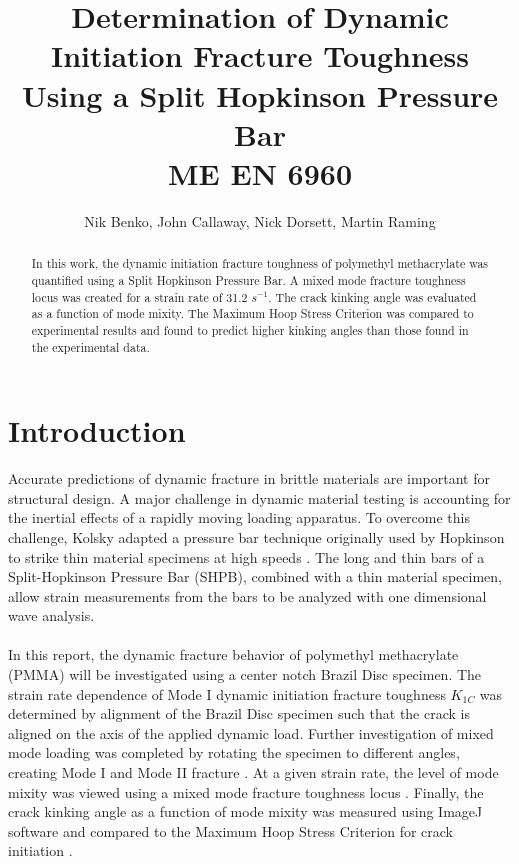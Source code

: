 \documentclass[12pt]{article}
\begin{document}
\title{ Determination of Dynamic Initiation Fracture Toughness Using a Split Hopkinson Pressure Bar  \\ \normalsize{ME EN 6960}}
\author{Nik Benko, John Callaway, Nick Dorsett, Martin Raming}
\maketitle

\begin{abstract} 
In this work, the dynamic initiation fracture toughness of polymethyl methacrylate was quantified using a Split Hopkinson Pressure Bar. A mixed mode fracture toughness locus was created for a strain rate of 31.2 $s^{-1}$. The crack kinking angle was evaluated as a function of mode mixity. The Maximum Hoop Stress Criterion was compared to experimental results and found to predict higher kinking angles than those found in the experimental data.
\end{abstract}

\section{Introduction} %

Accurate predictions of dynamic fracture in brittle materials are important for structural design. A major challenge in dynamic material testing is accounting for the inertial effects of a rapidly moving loading apparatus. To overcome this challenge, Kolsky adapted a pressure bar technique originally used by Hopkinson to strike thin material specimens at high speeds \cite{Kolsky}. The long and thin bars of a Split-Hopkinson Pressure Bar (SHPB), combined with a thin material specimen, allow strain measurements from the bars to be analyzed with one dimensional wave analysis. 
\\ \\
In this report, the dynamic fracture behavior of polymethyl methacrylate (PMMA) will be investigated using a center notch Brazil Disc specimen. The strain rate dependence of Mode I dynamic initiation fracture toughness $K_{1C}$ was determined by alignment of the Brazil Disc specimen such that the crack is aligned on the axis of the applied dynamic load. Further investigation of mixed mode loading was completed by rotating the specimen to different angles, creating Mode I and Mode II fracture \cite{Atkinson} \cite{Shetty}. At a given strain rate, the level of mode mixity was viewed using a mixed mode fracture toughness locus \cite{Nakano}. Finally, the crack kinking angle as a function of mode mixity was measured using ImageJ software and compared to the Maximum Hoop Stress Criterion for crack initiation \cite{ImageJ} \cite{Meggiolaro}.  
 
\end{document}

